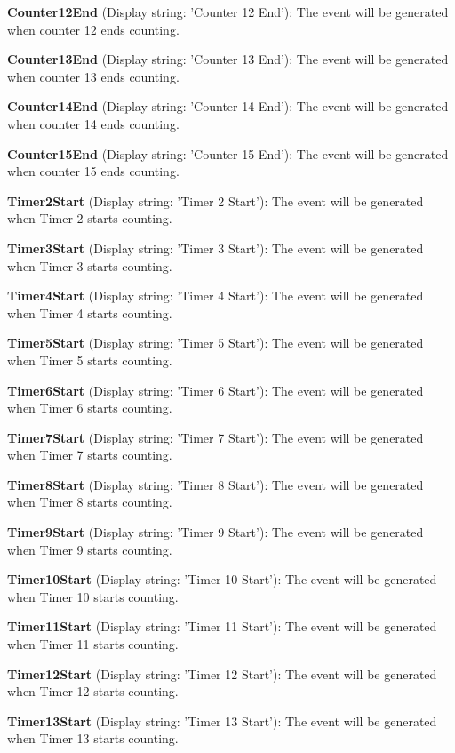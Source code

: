 \begin{DoxyItemize}
\item {\bfseries Counter12\+End} (Display string\+: 'Counter 12 End')\+: The event will be generated when counter 12 ends counting.
\item {\bfseries Counter13\+End} (Display string\+: 'Counter 13 End')\+: The event will be generated when counter 13 ends counting.
\item {\bfseries Counter14\+End} (Display string\+: 'Counter 14 End')\+: The event will be generated when counter 14 ends counting.
\item {\bfseries Counter15\+End} (Display string\+: 'Counter 15 End')\+: The event will be generated when counter 15 ends counting.
\item {\bfseries Timer2\+Start} (Display string\+: 'Timer 2 Start')\+: The event will be generated when Timer 2 starts counting.
\item {\bfseries Timer3\+Start} (Display string\+: 'Timer 3 Start')\+: The event will be generated when Timer 3 starts counting.
\item {\bfseries Timer4\+Start} (Display string\+: 'Timer 4 Start')\+: The event will be generated when Timer 4 starts counting.
\item {\bfseries Timer5\+Start} (Display string\+: 'Timer 5 Start')\+: The event will be generated when Timer 5 starts counting.
\item {\bfseries Timer6\+Start} (Display string\+: 'Timer 6 Start')\+: The event will be generated when Timer 6 starts counting.
\item {\bfseries Timer7\+Start} (Display string\+: 'Timer 7 Start')\+: The event will be generated when Timer 7 starts counting.
\item {\bfseries Timer8\+Start} (Display string\+: 'Timer 8 Start')\+: The event will be generated when Timer 8 starts counting.
\item {\bfseries Timer9\+Start} (Display string\+: 'Timer 9 Start')\+: The event will be generated when Timer 9 starts counting.
\item {\bfseries Timer10\+Start} (Display string\+: 'Timer 10 Start')\+: The event will be generated when Timer 10 starts counting.
\item {\bfseries Timer11\+Start} (Display string\+: 'Timer 11 Start')\+: The event will be generated when Timer 11 starts counting.
\item {\bfseries Timer12\+Start} (Display string\+: 'Timer 12 Start')\+: The event will be generated when Timer 12 starts counting.
\item {\bfseries Timer13\+Start} (Display string\+: 'Timer 13 Start')\+: The event will be generated when Timer 13 starts counting.

\end{DoxyItemize}
